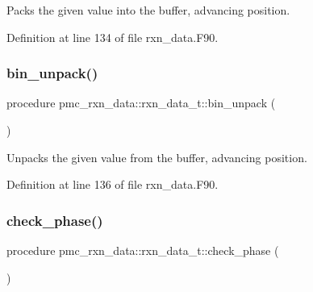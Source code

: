 Packs the given value into the buffer, advancing position. 



Definition at line 134 of file rxn\+\_\+data.\+F90.

\mbox{\label{structpmc__rxn__data_1_1rxn__data__t_ac30811244f805e4910ae3ecadac87f40}} 
\subsubsection{\texorpdfstring{bin\+\_\+unpack()}{bin\_unpack()}}
{\footnotesize\ttfamily procedure pmc\+\_\+rxn\+\_\+data\+::rxn\+\_\+data\+\_\+t\+::bin\+\_\+unpack (\begin{DoxyParamCaption}{ }\end{DoxyParamCaption})\hspace{0.3cm}{\ttfamily [private]}}



Unpacks the given value from the buffer, advancing position. 



Definition at line 136 of file rxn\+\_\+data.\+F90.

\mbox{\label{structpmc__rxn__data_1_1rxn__data__t_a2cfdf5f6aedd25000492e6152716ff8a}} 
\subsubsection{\texorpdfstring{check\+\_\+phase()}{check\_phase()}}
{\footnotesize\ttfamily procedure pmc\+\_\+rxn\+\_\+data\+::rxn\+\_\+data\+\_\+t\+::check\+\_\+phase (\begin{DoxyParamCaption}{ }\end{DoxyParamCaption})\hspace{0.3cm}{\ttfamily [private]}}



